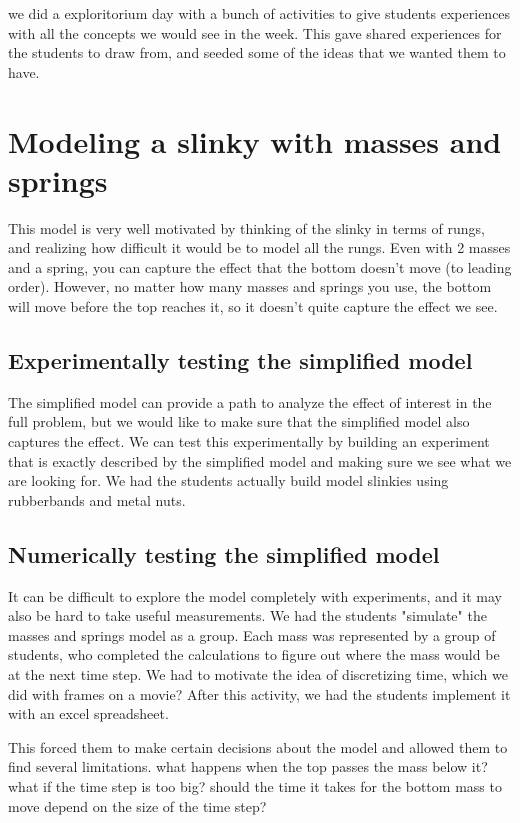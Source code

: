 \documentclass[aps,pra,twocolumn,10pt,superscriptaddress,showpacs,amsmath,amssymb,nofootinbib]{revtex4-1}
\begin{document}
we did a exploritorium day with a bunch of activities to give students experiences with all the concepts we would see in the week.  This gave shared experiences for the students to draw from, and seeded some of the ideas that we wanted them to have.

\section{Modeling a slinky with masses and springs}

This model is very well motivated by thinking of the slinky in terms of rungs, and realizing how difficult it would be to model all the rungs.  Even with 2 masses and a spring, you can capture the effect that the bottom doesn't move (to leading order).  However, no matter how many masses and springs you use, the bottom will move before the top reaches it, so it doesn't quite capture the effect we see. 

\subsection{Experimentally testing the simplified model}
The simplified model can provide a path to analyze the effect of interest in the full problem, but we would like to make sure that the simplified model also captures the effect.  We can test this experimentally by building an experiment that is exactly described by the simplified model and making sure we see what we are looking for.  We had the students actually build model slinkies using rubberbands and metal nuts.  


\subsection{Numerically testing the simplified model}
It can be difficult to explore the model completely with experiments,  and it may also be hard to take useful measurements.  We had the students "simulate" the masses and springs model as a group. Each mass was represented by a group of students, who completed the calculations to figure out where the mass would be at the next time step.  We had to motivate the idea of discretizing time, which we did with frames on a movie?  After this activity, we had the students implement it with an excel spreadsheet.  

This forced them to make certain decisions about the model and allowed them to find several limitations.  what happens when the top passes the mass below it?  what if the time step is too big?  should the time it takes for the bottom mass to move depend on the size of the time step?
\end{document}
